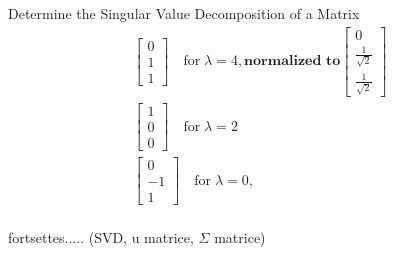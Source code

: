 \begin{example}{Determine the Singular Value Decomposition of a Matrix}
    \begin{align*}
        \begin{bmatrix}
            0\\1\\1
        \end{bmatrix} \quad \text{for}\; \lambda=4, \textbf{normalized to} \begin{bmatrix}
            0\\\frac{1}{\sqrt{2}}\\\frac{1}{\sqrt{2}}
        \end{bmatrix}\\
        \begin{bmatrix}
            1\\0\\0
        \end{bmatrix} \quad \text{for}\; \lambda=2\\
        \begin{bmatrix}
            0\\-1\\1
        \end{bmatrix} \quad \text{for}\; \lambda=0, \\\
    \end{align*}
    
    fortsettes..... (SVD, u matrice, $\Sigma$ matrice)
\end{example}

